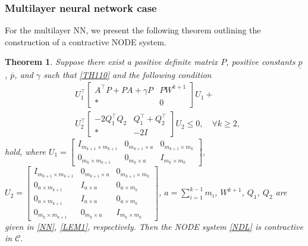 \documentclass[journal,twoside,web]{ieeecolor}
\newtheorem{theorem}            {Theorem}[section]
\newcommand{\bbm}[1]{\left[\begin{matrix} #1 \end{matrix}\right]}
\begin{document}
\subsubsection{‌Multilayer neural network case}
For the multilayer NN, we present the following theorem outlining the construction of a contractive NODE system.
\begin{theorem}\label{theorem1}
Suppose there exist a positive definite matrix $P$, positive constants $\underline{p}$, $\overline{p}$, and $\gamma$ such that \eqref{TH110} and the following condition 
\begin{equation}\label{TH12}
\begin{aligned}
&U_1^\top
\begin{bmatrix}
     A^\top P+PA+\gamma P &PW^{k+1}\\
  \ast& 0
\end{bmatrix}U_1+\\&U_2^\top\begin{bmatrix}
 -2Q_1^\top Q_2&Q_1^\top+Q_2^\top
 \\
\ast&-2I
\end{bmatrix}U_2\leq 0, \quad\forall k\geq 2,
\end{aligned}
\end{equation}
hold, where $U_1=\bbm{I_{m_{k+1}\times m_{k+1}} &0_{m_{k+1}\times a}&0_{m_{k+1}\times m_{k}}\\0_{m_{k}\times m_{k+1}}&0_{m_{k}\times a}&I_{m_{k}\times m_{k}}}$, $U_2=\bbm{I_{m_{k+1}\times m_{k+1}} &0_{m_{k+1}\times a}&0_{m_{k+1}\times m_{k}}\\0_{a\times m_{k+1}}&I_{a\times a}&0_{a\times m_{k}}\\0_{a\times m_{k+1}}&I_{a\times a}&0_{a\times m_{k}}\\0_{m_{k}\times m_{k+1}}&0_{m_{k}\times a}&I_{m_{k}\times m_{k}}}$, $a=\sum_{i=1}^{k-1}m_i$, $W^{k+1}$, $Q_1$, $Q_2$ are given in \eqref{NN}, \eqref{LEM1}, respectively. Then the NODE system \eqref{NDL} is contractive in $\mathcal{C}$.
\end{theorem}
\end{document}
